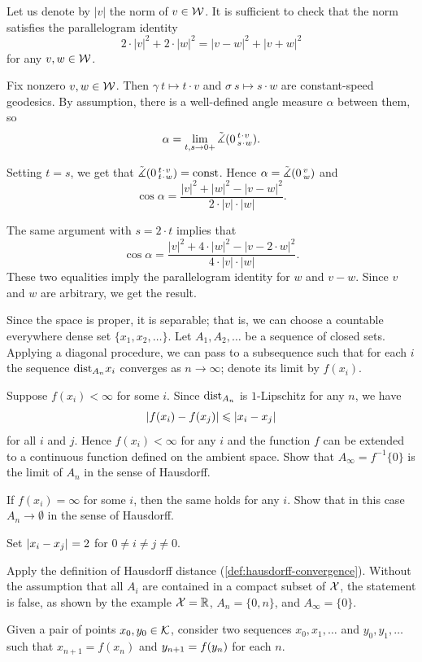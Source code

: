 Let us denote by $|v|$ the norm of $v\in\mathcal{W}$.
It is sufficient to check that the norm satisfies the parallelogram identity
\[2\cdot |v|^2+2\cdot |w|^2=|v-w|^2+|v+w|^2\]
for any $v,w\in \mathcal{W}$.

Fix nonzero $v,w\in \mathcal{W}$.
Then $\gamma\:t\mapsto t\cdot v$ and $\sigma\:s\mapsto s\cdot w$ are constant-speed geodesics.
By assumption, there is a well-defined angle measure $\alpha$ between them, so
\[\alpha=\lim_{t,s\to 0+} \angk 0{t\cdot v}{s\cdot w}.\]

Setting $t=s$, we get that  $\angk 0{t\cdot v}{t\cdot w}=\const$.
Hence $\alpha=\tilde\measuredangle(0\,{}^{v}_{w})$ and
 \[\cos \alpha=\frac{|v|^2+|w|^2-|v-w|^2}{2\cdot|v|\cdot |w|}.\]

The same argument with $s=2\cdot t$ implies that
\[\cos \alpha=\frac{|v|^2+4\cdot |w|^2-|v-2\cdot w|^2}{4\cdot |v|\cdot |w|}.\]
These two equalities imply the parallelogram identity for $w$ and $v-w$.
Since $v$ and $w$ are arbitrary, we get the result.

Since the space is proper, it is separable; 
that is, we can choose a countable everywhere dense set $\{x_1,x_2,\dots\}$.
Let $A_1,A_2,\dots$ be a sequence of closed sets.
Applying a diagonal procedure, we can pass to a subsequence such that for each $i$ the sequence $\mathrm{dist}_{A_n}x_i$ converges as $n\to\infty$; denote its limit by $f(x_i)$.

Suppose $f(x_i)<\infty$ for some $i$.
Since $\mathrm{dist}_{A_n}$ is $1$-Lipschitz for any $n$, we have 
\[|f(x_i)-f(x_j)|\le \dist{x_i}{x_j}{}\]
for all $i$ and $j$.
Hence $f(x_i)<\infty$ for any $i$ and the function $f$ can be extended to a continuous function defined on the ambient space.
Show that $A_\infty=f^{-1}\{0\}$ is the limit of $A_n$ in the sense of Hausdorff.

If $f(x_i)=\infty$ for some $i$, then the same holds for any $i$.
Show that in this case $A_n\to\emptyset$ in the sense of Hausdorff.

Set $\dist{x_i}{x_j}{}=2$ for $0\ne i\ne j\ne 0$.

Apply the definition of Hausdorff distance (\ref{def:hausdorff-convergence}).
Without the assumption that all $A_i$ are contained in a compact subset of $\mathcal{X}$, the statement is false, as shown by the example $\mathcal{X}=\mathbb{R}$, $A_n=\{0,n\}$, and $A_\infty=\{0\}$.

Given a pair of points $x_0,y_0\in \mathcal{K}$, 
consider two sequences $x_0,x_1,\dots$ and $y_0,y_1,\dots$
such that $x_{n+1}=f(x_n)$ and $y_{n+1}\z=f(y_n)$ for each $n$.


